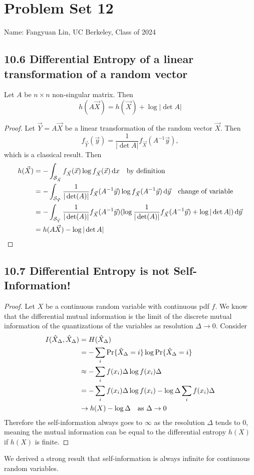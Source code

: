\documentclass[../main.tex]{subfiles}
\begin{document}
\section*{Problem Set 12}
    Name: Fangyuan Lin, UC Berkeley, Class of 2024

\subsection*{10.6 Differential Entropy of a linear transformation of a random vector}
Let $A$ be $n\times n$ non-singular matrix. Then \[
h(A\vec X) = h(\vec X)+ \log |\det A|
\]
\begin{proof}
    Let $\vec Y=A\vec X$ be a linear transformation of the random vector $\vec X$. Then \[
    f_{\vec Y}(\vec y) = \frac{1}{|\det A|}f_{\vec X}(A^{-1}\vec y),
    \] which is a classical result.
    Then \begin{align*}
        h(\vec X) &= -\int_{\mathcal{S}_{\vec X}}f_{\vec X}(\vec x)\log f_{\vec X}(\vec x)\,\mathrm{d} x\quad \text{by definition}\\
        &= - \int_{\mathcal{S}_{\vec Y}}\frac{1}{|\det(A)|}f_{\vec X}(A^{-1}\vec y)\log f_{\vec X}(A^{-1}\vec y)\,\mathrm{d} \vec y \quad \text{change of variable}\\
        &= - \int_{\mathcal{S}_{\vec Y}}\frac{1}{|\det(A)|}f_{\vec X}(A^{-1}\vec y)(\log \frac{1}{|\det(A)|}f_{\vec X}(A^{-1}\vec y) + \log |\det A|)\,\mathrm{d} \vec y\\
        &= h(A\vec X) - \log |\det A|
    \end{align*}
\end{proof}
\subsection*{10.7 Differential Entropy is not Self-Information!}
\begin{proof}
    Let $X$ be a continuous random variable with continuous pdf $f$. We know that the differential mutual information is the limit of the discrete mutual information of the quantizations of the variables as resolution $\Delta \to 0$. Consider \begin{align*}
        I(\hat X_\Delta, \hat X_\Delta) &= H(\hat X_\Delta) \\
        &= -\sum_i \Pr\{\hat X_\Delta = i\}\log \Pr\{\hat X_\Delta = i\} \\
        &\approx -\sum_i f(x_i)\Delta \log f(x_i)\Delta\\
        &= -\sum_i f(x_i)\Delta \log f(x_i) - \log \Delta\sum_if(x_i)\Delta\\
        &\to h(X)-\log \Delta \quad \text{as $\Delta\to 0$}
    \end{align*}
    Therefore the self-information always goes to $\infty$ as the resolution $\Delta$ tends to $0$, meaning the mutual information can be equal to the differential entropy $h(X)$ if $h(X)$ is finite.
\end{proof}
\begin{remark}
    We derived a strong result that self-information is always infinite for continuous random variables.
\end{remark}
\end{document}
